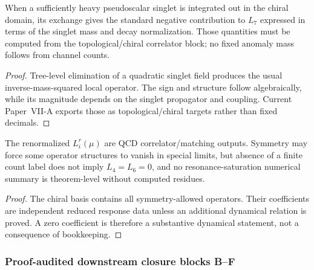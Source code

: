 \documentclass[12pt,a4paper]{article}
\begin{document}
\begin{theorem}
\label{p11:thm:native-L7-anomalous}

When a sufficiently heavy pseudoscalar singlet is integrated out in the chiral domain, its exchange gives the standard negative contribution to \(L_7\) expressed in terms of the singlet mass and decay normalization.  Those quantities must be computed from the topological/chiral correlator block; no fixed anomaly mass follows from channel counts.
\label{p11:eq:native-L7}
\end{theorem}
\begin{proof}

Tree-level elimination of a quadratic singlet field produces the usual inverse-mass-squared local operator.  The sign and structure follow algebraically, while its magnitude depends on the singlet propagator and coupling.  Current Paper~VII-A exports those as topological/chiral targets rather than fixed decimals.
\end{proof}

\begin{corollary}
\label{p11:cor:native-leading-p7-constants-summary}

The renormalized \(L_i^r(\mu)\) are QCD correlator/matching outputs.  Symmetry may force some operator structures to vanish in special limits, but absence of a finite count label does not imply \(L_4=L_6=0\), and no resonance-saturation numerical summary is theorem-level without computed residues.
\label{p11:eq:native-leading-p7-constants-summary}
\end{corollary}
\begin{proof}

The chiral basis contains all symmetry-allowed operators.  Their coefficients are independent reduced response data unless an additional dynamical relation is proved.  A zero coefficient is therefore a substantive dynamical statement, not a consequence of bookkeeping.
\end{proof}



\subsubsection{Proof-audited downstream closure blocks B--F}
\label{p11:sec:block-b-through-f-closures}
\end{document}
